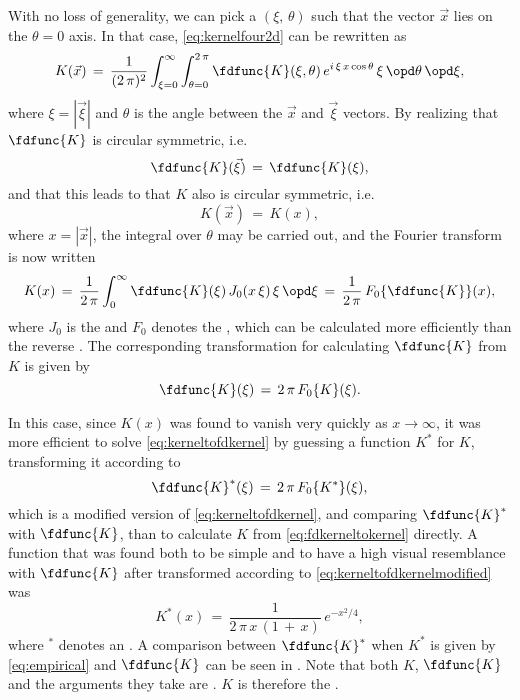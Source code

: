 With no loss of generality, we can pick a  $(\xi,\,\theta)$ such that the vector $\vec{x}$ lies on the $\theta = 0$ axis. In that case, \eqref{eq:kernelfour2d} can be rewritten as
%
\begin{equation}
K(\vec{x}) \,=\, \frac{1}{(2\,\pi)^2}\int_{\xi=0}^\infty\int_{\theta=0}^{2\,\pi}\fdfunc{K}(\xi, \theta)\,e^{i\,\xi\,x\cos\theta}\,\xi\,\opd\theta\,\opd\xi,
\end{equation}
%
where $\xi = |\vec{\xi}|$ and $\theta$ is the angle between the $\vec{x}$ and $\vec{\xi}$ vectors. By realizing that $\fdfunc{K}$ is circular symmetric, i.e.
%
\begin{equation}
\fdfunc{K}(\vec{\xi}) \,=\, \fdfunc{K}(\xi),
\end{equation}
%
and that this leads to that $K$ also is circular symmetric, i.e.
%
\begin{equation}
K(\vec{x}) \,=\, K(x),
\end{equation}
%
where $x = |\vec{x}|$, the integral over $\theta$ may be carried out, and the Fourier transform is now written
%
\begin{equation} \label{eq:fdkerneltokernel}
K(x) \,=\, \frac{1}{2\,\pi}\int_0^\infty\fdfunc{K}(\xi)\,J_0(x\,\xi)\,\xi\,\opd\xi \,=\, \frac{1}{2\,\pi}\,F_0\{\fdfunc{K}\}(x),
\end{equation}
%
where $J_0$ is the  and $F_0$ denotes the , which can be calculated more efficiently than the reverse . The corresponding transformation for calculating $\fdfunc{K}$ from $K$ is given by
%
\begin{equation} \label{eq:kerneltofdkernel}
\fdfunc{K}(\xi) \,=\, 2\,\pi\,F_0\{K\}(\xi).
\end{equation}

In this case, since $K(x)$ was found to vanish very quickly as $x\rightarrow\infty$, it was more efficient to solve \eqref{eq:kerneltofdkernel} by guessing a function $K^*$ for $K$, transforming it according to
%
\begin{equation} \label{eq:kerneltofdkernelmodified}
\fdfunc{K}^*(\xi) \,=\, 2\,\pi\,F_0\{K^*\}(\xi),
\end{equation}
%
which is a modified version of \eqref{eq:kerneltofdkernel}, and comparing $\fdfunc{K}^*$ with $\fdfunc{K}$, than to calculate $K$ from \eqref{eq:fdkerneltokernel} directly. A function that was found both to be simple and to have a high visual resemblance with $\fdfunc{K}$ after transformed according to \eqref{eq:kerneltofdkernelmodified} was
%
\begin{equation} \label{eq:empirical}
K^*(x) \,=\, \frac{1}{2\,\pi\,x\,(1\,+\,x)}\,e^{-x^2/4},
\end{equation}
%
where $^*$ denotes an \estimate. A comparison between $\fdfunc{K}^*$ when $K^*$ is given by \eqref{eq:empirical} and $\fdfunc{K}$ can be seen in . Note that both $K$, $\fdfunc{K}$ and the arguments they take are . $K$ is therefore the .


